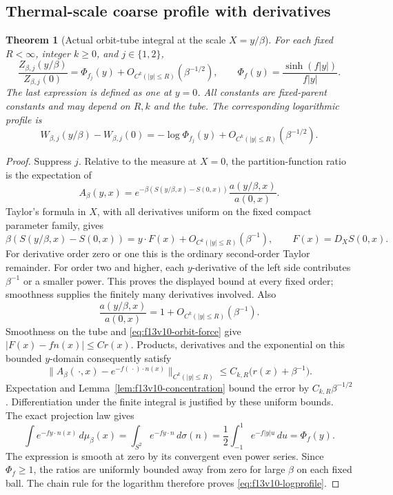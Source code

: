 \documentclass[11pt,oneside]{article}
\newtheorem{theorem}{Theorem}[section]
\begin{document}
\subsection{Thermal-scale coarse profile with derivatives}

\begin{theorem}[Actual orbit-tube integral at the scale \(X=y/\beta\)]
\label{thm:f13v10-profile}
For each fixed \(R<\infty\), integer \(k\ge0\), and
\(j\in\{1,2\}\),
\begin{equation}\label{eq:f13v10-profile}
 \frac{Z_{\beta,j}(y/\beta)}{Z_{\beta,j}(0)}
 =\Phi_{f_j}(y)+O_{C^k(|y|\le R)}(\beta^{-1/2}),\qquad
 \Phi_f(y)=\frac{\sinh(f|y|)}{f|y|}.
\end{equation}
The last expression is defined as one at \(y=0\).
All constants are fixed-parent constants and may depend
on \(R,k\) and the tube. The corresponding logarithmic
profile is
\begin{equation}\label{eq:f13v10-logprofile}
 W_{\beta,j}(y/\beta)-W_{\beta,j}(0)
 =-\log\Phi_{f_j}(y)+O_{C^k(|y|\le R)}(\beta^{-1/2}).
\end{equation}
\end{theorem}

\begin{proof}
Suppress \(j\). Relative to the measure at \(X=0\), the
partition-function ratio is the expectation of
\[
 A_\beta(y,x)=
 e^{-\beta(S(y/\beta,x)-S(0,x))}
                        \frac{a(y/\beta,x)}{a(0,x)}.
\]
Taylor's formula in \(X\), with all derivatives uniform
on the fixed compact parameter family, gives
\[
 \beta(S(y/\beta,x)-S(0,x))
                  =y\cdot F(x)+O_{C^k(|y|\le R)}(\beta^{-1}),
 \qquad F(x)=D_XS(0,x).
\]
For derivative order zero or one this is the ordinary
second-order Taylor remainder. For order two and higher,
each \(y\)-derivative of the left side contributes
\(\beta^{-1}\) or a smaller power. This proves the
displayed bound at every fixed order; smoothness supplies
the finitely many derivatives involved.
Also
\[
 \frac{a(y/\beta,x)}{a(0,x)}
                      =1+O_{C^k(|y|\le R)}(\beta^{-1}).
\]
Smoothness on the tube and
\eqref{eq:f13v10-orbit-force} give
\(|F(x)-f n(x)|\le C r(x)\). Products, derivatives and
the exponential on this bounded \(y\)-domain consequently
satisfy
\[
 \big\|A_\beta(\,\cdot,x)
              -e^{-f(\,\cdot)\cdot n(x)}\big\|_{C^k(|y|\le R)}
          \le C_{k,R}\big(r(x)+\beta^{-1}\big).
\]
Expectation and Lemma~\ref{lem:f13v10-concentration}
bound the error by \(C_{k,R}\beta^{-1/2}\).
Differentiation under the finite integral is justified
by these uniform bounds. The exact projection law gives
\[
 \int e^{-fy\cdot n(x)}\,d\mu_\beta(x)
 =\int_{S^2}e^{-fy\cdot n}\,d\sigma(n)
 =\frac12\int_{-1}^{1}e^{-f|y|u}\,du
 =\Phi_f(y).
\]
The expression is smooth at zero by its convergent
even power series. Since \(\Phi_f\ge1\), the ratios
are uniformly bounded away from zero for large \(\beta\)
on each fixed ball. The chain rule for the logarithm
therefore proves \eqref{eq:f13v10-logprofile}.
\end{proof}
\end{document}
